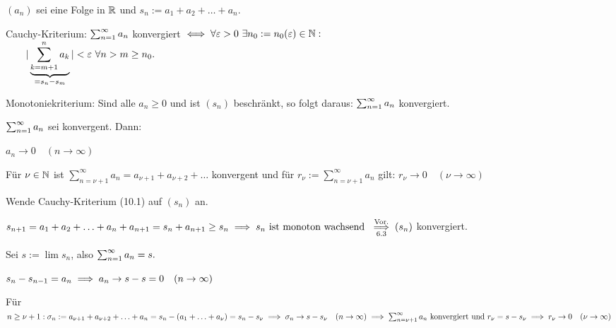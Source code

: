 \documentclass[a4paper,twoside,DIV15,BCOR12mm]{scrbook}
\begin{document}
\begin{satz}
$(a_n)$ sei eine Folge in $\mathbb{R}$ und $s_n := a_1+a_2+\ldots+a_n$.
\begin{liste}
\item Cauchy-Kriterium:
$\sum_{n=1}^{\infty}{a_n}$ konvergiert $\iff \forall \varepsilon>0\ \exists n_0 := n_0(\varepsilon)\in\mathbb{N}:$\\
$\qquad|\underbrace{\sum_{k=m+1}^n{a_k}}_{=s_n-s_m}| < \varepsilon\ \forall n>m \ge n_0.$

\item Monotoniekriterium: Sind alle $a_n \ge 0$ und ist $(s_n)$ beschränkt, so folgt daraus: $\sum_{n=1}^{\infty}{a_n}$ konvergiert.

\item $\sum_{n=1}^{\infty}{a_n}$ sei konvergent. Dann:
 \begin{liste}
 \item $a_n \to 0\quad(n\to\infty)$
 \item Für $\nu\in\mathbb{N}$ ist $\sum_{n=\nu+1}^{\infty}{a_n} = a_{\nu+1}+a_{\nu+2}+\ldots$ konvergent und für $r_\nu := \sum_{n=\nu+1}^{\infty}{a_n}$ gilt: $r_\nu \to 0\quad(\nu \to \infty)$
 \end{liste}
\end{liste}
\end{satz}

\begin{beweise}
\item Wende Cauchy-Kriterium (10.1) auf $(s_n)$ an.

\item $s_{n+1} = a_1+a_2+\ldots+a_n+a_{n+1} = s_n+a_{n+1} \ge s_n \implies s_n\text{ ist monoton wachsend } \overset{\text{Vor.}}{\underset{\text{6.3}}{\implies}} (s_n)$ konvergiert.

\item Sei $s := \lim s_n$, also $\sum_{n=1}^{\infty}{a_n} = s.$
 \begin{liste}
 \item $s_n-s_{n-1} = a_n \implies a_n \to s-s = 0\quad(n\to\infty)$
 \item Für $n \ge \nu+1: \sigma_n := a_{\nu+1}+a_{\nu+2}+\ldots+a_n = s_n-(a_1+\ldots+a_\nu) = s_n-s_\nu\\
 \implies \sigma_n \to s-s_\nu\quad(n\to\infty)\\
 \implies \sum_{n=\nu+1}^{\infty}{a_n}\text{ konvergiert und } r_\nu = s-s_\nu\\
 \implies r_\nu \to 0\quad(\nu\to\infty)$
 \end{liste}
\end{beweise}
\end{document}
